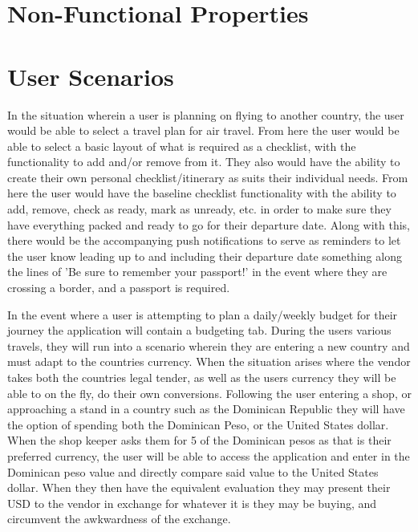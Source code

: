 \documentclass[12pt]{article}
\begin{document}
\section*{Non-Functional Properties}

\section*{User Scenarios}

	In the situation wherein a user is planning on flying to another country, the user would be able to select a travel plan for air travel.
	From here the user would be able to select a basic layout of what is required as a checklist, with the functionality to add and/or remove from it.
	They also would have the ability to create their own personal checklist/itinerary as suits their individual needs.
	From here the user would have the baseline checklist functionality with the ability to add, remove, check as ready, mark as unready, etc. in order to make sure they have everything packed and ready to go for their departure date.
	Along with this, there would be the accompanying push notifications to serve as reminders to let the user know leading up to and including their departure date something along the lines of 'Be sure to remember your passport!' in the event where they are crossing a border, and a passport is required.

	In the event where a user is attempting to plan a daily/weekly budget for their journey the application will contain a budgeting tab.
	During the users various travels, they will run into a scenario wherein they are entering a new country and must adapt to the countries currency.
	When the situation arises where the vendor takes both the countries legal tender, as well as the users currency they will be able to on the fly, do their own conversions.
	Following the user entering a shop, or approaching a stand in a country such as the Dominican Republic they will have the option of spending both the Dominican	Peso, or the United States dollar.
	When the shop keeper asks them for 5 of the Dominican pesos as that is their preferred currency, the user will be able to access the application and enter in the Dominican peso value and directly compare said value to the United States dollar.
	When they then have the equivalent evaluation they may present their USD to the vendor in exchange for whatever it is they may be buying, and circumvent the awkwardness of the exchange.
\end{document}
